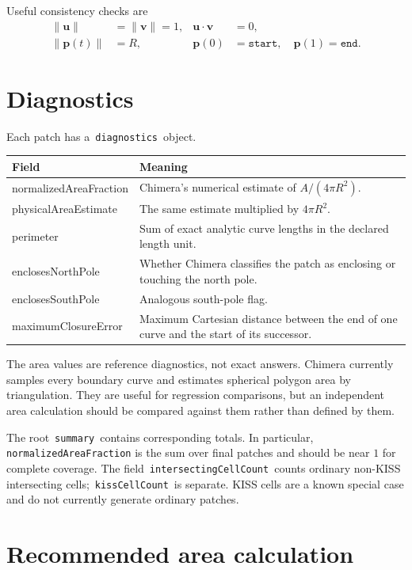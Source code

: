 \documentclass[11pt]{article}
\newcommand{\field}[1]{\texttt{#1}}
\newcommand{\vect}[1]{\boldsymbol{#1}}
\begin{document}
Useful consistency checks are
\begin{align}
  \|\vect{u}\|&=\|\vect{v}\|=1, &
  \vect{u}\cdot\vect{v}&=0,\\
  \|\vect{p}(t)\|&=R, &
  \vect{p}(0)&=\field{start},\quad
  \vect{p}(1)=\field{end}.
\end{align}

\section{Diagnostics}

Each patch has a \,\field{diagnostics}\, object.

\begin{longtable}{>{\ttfamily}p{}p{}}
\toprule
\normalfont Field & Meaning \\
\midrule
\endhead
normalizedAreaFraction & Chimera's numerical estimate of $A/(4\pi R^2)$. \\
physicalAreaEstimate & The same estimate multiplied by $4\pi R^2$. \\
perimeter & Sum of exact analytic curve lengths in the declared length unit. \\
enclosesNorthPole & Whether Chimera classifies the patch as enclosing or touching
the north pole. \\
enclosesSouthPole & Analogous south-pole flag. \\
maximumClosureError & Maximum Cartesian distance between the end of one curve
and the start of its successor. \\
\bottomrule
\end{longtable}

The area values are reference diagnostics, not exact answers.  Chimera
currently samples every boundary curve and estimates spherical polygon area by
triangulation.  They are useful for regression comparisons, but an independent
area calculation should be compared against them rather than defined by them.

The root \,\field{summary}\, contains corresponding totals.  In particular,
\field{normalizedAreaFraction} is the sum over final patches and should be near
$1$ for complete coverage.  The field \,\field{intersectingCellCount}\, counts
ordinary non-KISS intersecting cells; \,\field{kissCellCount}\, is separate.
KISS cells are a known special case and do not currently generate ordinary
patches.

\section{Recommended area calculation}
\end{document}
